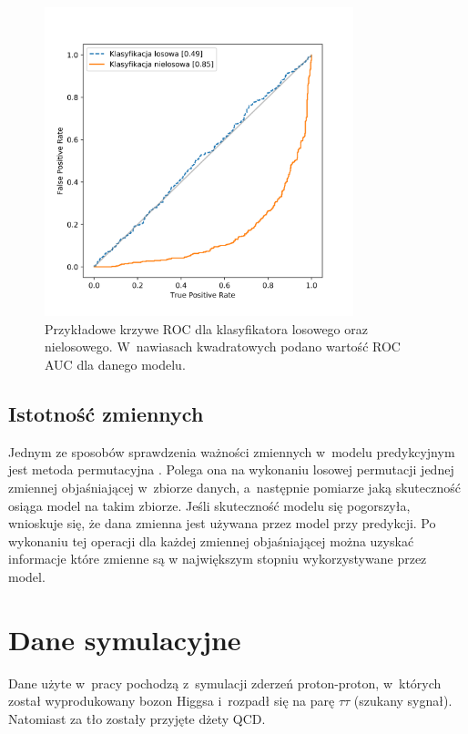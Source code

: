 \documentclass{pracalicmgr}
\begin{document}
	\begin{figure}[h]
	\centering
	\includegraphics[width=0.8\textwidth]{roc_example.png}
	\caption{Przykładowe krzywe ROC dla klasyfikatora losowego oraz nielosowego. W~nawiasach kwadratowych podano wartość ROC AUC dla danego modelu.}
	\label{fig:roc}
	\end{figure}
	
	\section{Istotność zmiennych}
	Jednym ze sposobów sprawdzenia ważności zmiennych w~modelu predykcyjnym jest metoda permutacyjna \cite{breiman2001random}. Polega ona na wykonaniu losowej permutacji jednej zmiennej objaśniającej w~zbiorze danych, a~następnie pomiarze jaką skuteczność osiąga model na takim zbiorze. Jeśli skuteczność modelu się pogorszyła, wnioskuje się, że dana zmienna jest używana przez model przy predykcji. Po wykonaniu tej operacji dla każdej zmiennej objaśniającej można uzyskać informacje które zmienne są w największym stopniu wykorzystywane przez model.
	
    \chapter{Dane symulacyjne}
    \label{ch:dane}
    Dane użyte w~pracy pochodzą z~symulacji zderzeń proton-proton, w~których został wyprodukowany bozon Higgsa i~rozpadł się na parę $\tau\tau$ (szukany sygnał). Natomiast za tło zostały przyjęte dżety QCD.
	
\end{document}
